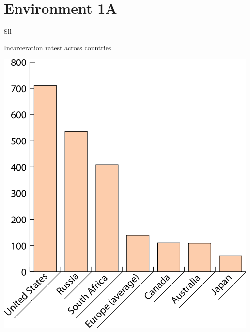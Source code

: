 \section{Environment 1A}

\lipsum[1-4]

\begin{chart}{S}{ll}
\caption{Incarceration ratest across countries}
\label{chart:incarceration}
\includegraphics[width=\chartwidth,height=\chartheight]{incarceration}  
\end{chart}

